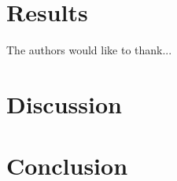 \documentclass[conference]{IEEEtran}
\begin{document}


\section*{Results}


The authors would like to thank...



\section*{Discussion}


\section*{Conclusion}


%
%
%




\end{document}
